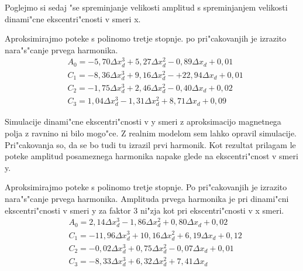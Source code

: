 Poglejmo si sedaj "se spreminjanje velikosti amplitud s spreminjanjem velikosti dinami"cne ekscentri"cnosti v smeri x.


Aproksimirajmo poteke s polinomo tretje stopnje. po pri"cakovanjih je izrazito nara"s"canje prvega harmonika.
\begin{eqnarray}
&A_0=-5,70 \Delta x_d^3+5,27 \Delta x_d^2-0,89 \Delta x_d+0,01\\
&C_1=-8,36\Delta x_d^3+9,16 \Delta x_d^2-+22,94 \Delta x_d+0,01\\
&C_2=-1,75\Delta x_d^3+2,46\Delta x_d^2-0,40\Delta x_d+0,02\\
&C_3=1,04\Delta x_d^3-1,31\Delta x_d^2+8,71\Delta x_d+0,09
\end{eqnarray}


Simulacije dinami"cne ekscentri"cnosti v y smeri z aproksimacijo magnetnega polja z ravnino ni bilo mogo"ce. Z realnim modelom sem lahko opravil simulacije. Pri"cakovanja so, da se bo tudi tu izrazil prvi harmonik. Kot rezultat prilagam le poteke amplitud posameznega harmonika napake glede na ekscentri"cnost v smeri y.


Aproksimirajmo poteke s polinomo tretje stopnje. Po pri"cakovanjih je izrazito nara"s"canje prvega harmonika. Amplituda prvega harmonika je pri dinami"cni ekscentri"cnosti v smeri y za faktor 3 ni"zja kot pri ekscentri"cnosti v x  smeri.
\begin{eqnarray}
&A_0=2,14 \Delta x_d^3-1,86\Delta x_d^2+0,80 \Delta x_d+0,02\\
&C_1=-11,96\Delta x_d^3+10,16 \Delta x_d^2+6,19 \Delta x_d+0,12\\
&C_2=-0,02\Delta x_d^3+0,75\Delta x_d^2-0,07\Delta x_d+0,01\\
&C_3=-8,33\Delta x_d^3+6,32\Delta x_d^2+7,41\Delta x_d
\end{eqnarray}

